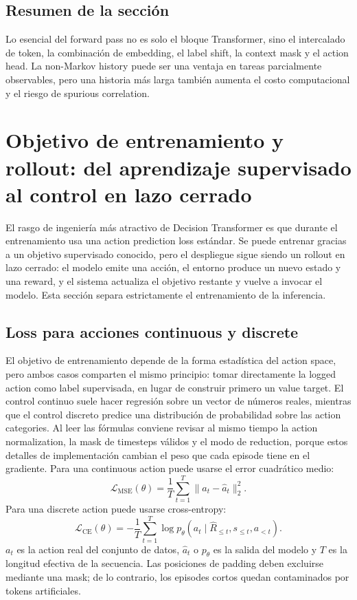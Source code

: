 \documentclass[a4paper]{article}
\begin{document}
\subsection{Resumen de la sección}

Lo esencial del forward pass no es solo el bloque Transformer, sino el intercalado de token, la combinación de embedding, el label shift, la context mask y el action head. La non-Markov history puede ser una ventaja en tareas parcialmente observables, pero una historia más larga también aumenta el costo computacional y el riesgo de spurious correlation.
\section{Objetivo de entrenamiento y rollout: del aprendizaje supervisado al control en lazo cerrado}

El rasgo de ingeniería más atractivo de Decision Transformer es que durante el entrenamiento usa una action prediction loss estándar. Se puede entrenar gracias a un objetivo supervisado conocido, pero el despliegue sigue siendo un rollout en lazo cerrado: el modelo emite una acción, el entorno produce un nuevo estado y una reward, y el sistema actualiza el objetivo restante y vuelve a invocar el modelo. Esta sección separa estrictamente el entrenamiento de la inferencia.

\subsection{Loss para acciones continuous y discrete}

El objetivo de entrenamiento depende de la forma estadística del action space, pero ambos casos comparten el mismo principio: tomar directamente la logged action como label supervisada, en lugar de construir primero un value target. El control continuo suele hacer regresión sobre un vector de números reales, mientras que el control discreto predice una distribución de probabilidad sobre las action categories. Al leer las fórmulas conviene revisar al mismo tiempo la action normalization, la mask de timesteps válidos y el modo de reduction, porque estos detalles de implementación cambian el peso que cada episode tiene en el gradiente. Para una continuous action puede usarse el error cuadrático medio:
\[
\mathcal{L}_{\mathrm{MSE}}(\theta)
=\frac{1}{T}\sum_{t=1}^{T}\lVert a_t-\widehat{a}_t\rVert_2^2.
\]
Para una discrete action puede usarse cross-entropy:
\[
\mathcal{L}_{\mathrm{CE}}(\theta)
=-\frac{1}{T}\sum_{t=1}^{T}\log p_{\theta}(a_t\mid \widehat{R}_{\le t},s_{\le t},a_{<t}).
\]
$a_t$ es la action real del conjunto de datos, $\widehat{a}_t$ o $p_{\theta}$ es la salida del modelo y $T$ es la longitud efectiva de la secuencia. Las posiciones de padding deben excluirse mediante una mask; de lo contrario, los episodes cortos quedan contaminados por tokens artificiales.
\end{document}
